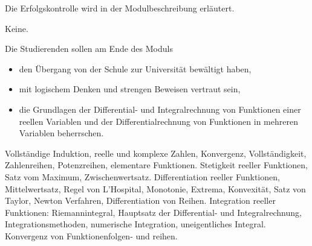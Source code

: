 \begin{course}

\setdoclanguagegerman
{}



\coursehead


\label{cour_7027.dp_997}


\begin{styleenv}
\begin{assessment}
Die Erfolgskontrolle wird in der Modulbeschreibung erläutert.


\end{assessment}

\begin{conditions}Keine.\end{conditions}


\end{styleenv}

\begin{learningoutcomes}
Die Studierenden sollen am Ende des Moduls

 \begin{itemize}\item den Übergang von der Schule zur Universität bewältigt haben,  \item mit logischem Denken und strengen Beweisen vertraut sein,  \item die Grundlagen der Differential- und Integralrechnung von Funktionen einer reellen Variablen und der Differentialrechnung von Funktionen in mehreren Variablen beherrschen.  \end{itemize}
\end{learningoutcomes}

\begin{content}
Vollständige Induktion, reelle und komplexe Zahlen, Konvergenz, Vollständigkeit, Zahlenreihen, Potenzreihen, elementare Funktionen. Stetigkeit reeller Funktionen, Satz vom Maximum, Zwischenwertsatz. Differentiation reeller Funktionen, Mittelwertsatz, Regel von L'Hospital, Monotonie, Extrema, Konvexität, Satz von Taylor, Newton Verfahren, Differentiation von Reihen. Integration reeller Funktionen: Riemannintegral, Hauptsatz der Differential- und Integralrechnung, Integrationsmethoden, numerische Integration, uneigentliches Integral. \newline
Konvergenz von Funktionenfolgen- und reihen.



\end{content}
\end{course}
